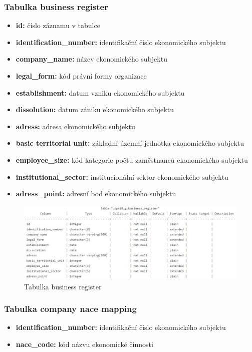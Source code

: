 \documentclass[a4paper, 12pt]{article}
\begin{document}
\subsubsection{Tabulka business register}
\begin{itemize}
\item \textbf{id:} číslo záznamu v tabulce
\item \textbf{identification\_number:} identifikační číslo ekonomického subjektu
\item \textbf{company\_name:} název ekonomického subjektu
\item \textbf{legal\_form:} kód právní formy organizace
\item \textbf{establishment:} datum vzniku ekonomického subjektu
\item \textbf{dissolution:} datum zániku ekonomického subjektu
\item \textbf{adress:} adresa ekonomického subjektu
\item \textbf{basic territorial unit:} základní územní jednotka ekonomického subjektu
\item \textbf{employee\_size:} kód kategorie počtu zaměstnanců ekonomického subjektu
\item \textbf{institutional\_sector:} institucionální sektor ekonomického subjektu
\item \textbf{adress\_point:} adresní bod ekonomického subjektu
\end{itemize}

\begin{figure}[h!]
	\centering
	\includegraphics[width=14cm]{br_tab.jpg}
	\caption{Tabulka business register}
\end{figure}

\subsubsection{Tabulka company nace mapping}
\begin{itemize}
\item \textbf{identification\_number:} identifikační číslo ekonomického subjektu
\item \textbf{nace\_code:} kód názvu ekonomické činnosti
\end{itemize}
\end{document}

